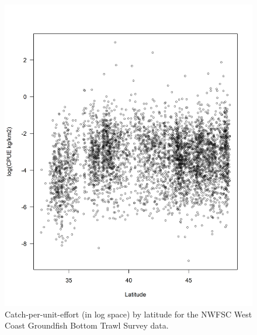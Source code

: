 \documentclass[12pt,]{article}
\begin{document}
\FloatBarrier

\begin{figure}
\centering
\includegraphics{Figures/NWFSC_CPUE_Lat.png}
\caption{Catch-per-unit-effort (in log space) by latitude for the NWFSC
West Coast Groundfish Bottom Trawl Survey data. \label{fig:nw_cpue_lat}}
\end{figure}

\FloatBarrier
\end{document}
